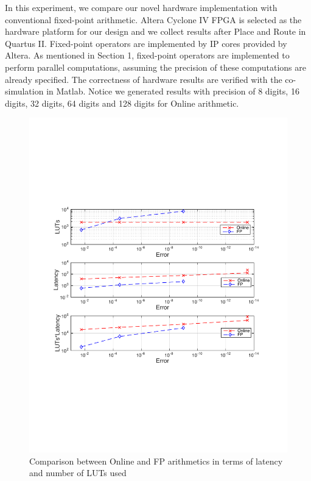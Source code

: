 \documentclass{sig-alternate}
\begin{document}
In this experiment, we compare our novel hardware implementation with conventional fixed-point arithmetic.
Altera Cyclone IV FPGA is selected as the hardware platform for our design and we collect results after Place and Route in Quartus II.   
Fixed-point operators are implemented by IP cores provided by Altera. As mentioned in Section 1, fixed-point operators are implemented to perform parallel computations, assuming the precision of these computations are already specified. The correctness of hardware results are verified with the co-simulation in Matlab. Notice we generated results with precision of 8 digits, 16 digits, 32 digits, 64 digits and 128 digits for Online arithmetic. 
\vspace{-8pt}
\begin{figure} [ht]
	\centering
	\includegraphics[scale=0.5]{figure101}
	\caption{Comparison between Online and FP arithmetics in terms of latency and number of LUTs used}
\end{figure}
\end{document}
